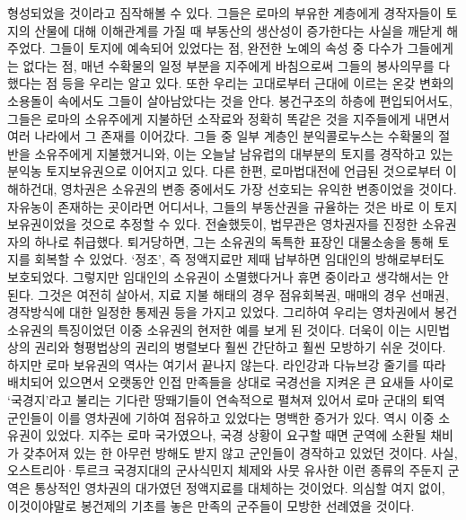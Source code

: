 형성되었을 것이라고 짐작해볼 수 있다.
그들은 로마의 부유한 계층에게
경작자들이 토지의 산물에 대해 이해관계를 가질 때
부동산의 생산성이 증가한다는 사실을
깨닫게 해주었다.
그들이 토지에 예속되어 있었다는 점,
완전한 노예의 속성 중 다수가 그들에게는 없다는 점,
매년 수확물의 일정 부분을 지주에게 바침으로써 그들의 봉사의무를
다했다는 점 등을
우리는 알고 있다.
또한 우리는 고대로부터 근대에 이르는 온갖 변화의 소용돌이 속에서도
그들이 살아남았다는 것을 안다.
봉건구조의 하층에 편입되어서도,
그들은 로마의 소유주에게 지불하던 소작료와 정확히
똑같은 것을 지주들에게 내면서 여러 나라에서 그 존재를 이어갔다.
그들 중 일부 계층인
분익콜로누스는
수확물의 절반을 소유주에게 지불했거니와,
이는
오늘날 남유럽의 대부분의 토지를 경작하고 있는
분익농 토지보유권으로 이어지고 있다.
다른 한편,
로마법대전에 언급된 것으로부터 이해하건대,
영차권은
소유권의 변종 중에서도
가장 선호되는 유익한 변종이었을 것이다.
자유농이 존재하는 곳이라면 어디서나,
그들의 부동산권을 규율하는 것은 바로 이 토지보유권이었을 것으로 추정할 수 있다.
전술했듯이, 법무관은 영차권자를
진정한 소유권자의 하나로 취급했다.
퇴거당하면, 그는
소유권의 독특한 표장인
대물소송을 통해 토지를 회복할 수 있었다.
`정조',
즉 정액지료만
제때 납부하면 임대인의 방해로부터도 보호되었다.
그렇지만 임대인의 소유권이
소멸했다거나 휴면 중이라고 생각해서는 안 된다.
그것은 여전히 살아서,
지료 지불 해태의 경우 점유회복권,
매매의 경우 선매권,
경작방식에 대한 일정한 통제권 등을 가지고 있었다.
그리하여 우리는 영차권에서
봉건 소유권의 특징이었던
이중 소유권의 현저한 예를 보게 된 것이다.
더욱이 이는
시민법상의 권리와 형평법상의 권리의 병렬보다
훨씬 간단하고 훨씬 모방하기 쉬운 것이다.
하지만 로마 보유권의 역사는 여기서 끝나지 않는다.
라인강과 다뉴브강 줄기를 따라
배치되어 있으면서
오랫동안
인접 만족들을 상대로
국경선을 지켜온
큰 요새들 사이로
`국경지'라고 불리는
기다란 땅뙈기들이
연속적으로 펼쳐져 있어서
로마 군대의 퇴역 군인들이 이를 영차권에 기하여
점유하고 있었다는
명백한 증거가 있다.
역시 이중 소유권이 있었다.
지주는 로마 국가였으나,
국경 상황이 요구할 때면 군역에 소환될 채비가 갖추어져 있는 한
아무런 방해도 받지 않고
군인들이
경작하고 있었던 것이다.
사실,
오스트리아^^b7투르크 국경지대의 군사식민지 체제와 사뭇 유사한
이런 종류의 주둔지 군역은
통상적인 영차권의 대가였던 정액지료를 대체하는 것이었다.
의심할 여지 없이,
이것이야말로
봉건제의 기초를 놓은
만족의 군주들이 모방한 선례였을 것이다.
